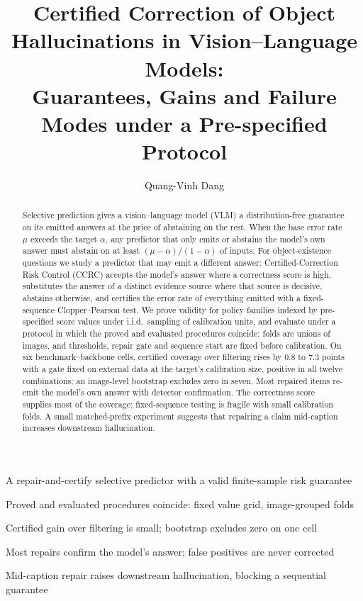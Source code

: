 \documentclass[review,number]{elsarticle}
\theoremstyle{plain}
\theoremstyle{definition}
\theoremstyle{remark}
\begin{document}
\begin{frontmatter}
\title{Certified Correction of Object Hallucinations in Vision--Language Models:\\
Guarantees, Gains and Failure Modes under a Pre-specified Protocol}

\author[bu]{Quang-Vinh Dang}
\address[bu]{British University Vietnam, Hung Yen, Vietnam}

\begin{abstract}
Selective prediction gives a vision--language model (VLM) a distribution-free guarantee on its emitted answers
at the price of abstaining on the rest. When the base error rate $\mu$ exceeds the target $\alpha$, any
predictor that only emits or abstains the model's own answer must abstain on at least $(\mu-\alpha)/(1-\alpha)$ of
inputs. For object-existence questions we study a predictor that may emit a different answer: Certified-Correction Risk Control (CCRC) accepts the
model's answer where a correctness score is high, substitutes the answer of a distinct evidence source where that source is decisive, abstains otherwise, and certifies the error rate of
everything emitted with a fixed-sequence Clopper--Pearson test. We prove validity for policy families indexed by
pre-specified score values under i.i.d.\ sampling of calibration units, and evaluate under a protocol in which the
proved and evaluated procedures coincide: folds are unions of images, and thresholds, repair gate and sequence start
are fixed before calibration. On six benchmark--backbone cells, certified coverage over filtering rises by $0.8$ to $7.3$
points with a gate fixed on external data at the target's calibration size, positive in all twelve combinations; an image-level bootstrap excludes zero in seven. Most repaired items re-emit the model's own answer with
detector confirmation. The correctness score supplies most of the coverage; fixed-sequence testing is fragile with small calibration folds. A small matched-prefix experiment suggests that repairing a claim mid-caption increases downstream
hallucination.
\end{abstract}

\begin{highlights}
\item A repair-and-certify selective predictor with a valid finite-sample risk guarantee
\item Proved and evaluated procedures coincide: fixed value grid, image-grouped folds
\item Certified gain over filtering is small; bootstrap excludes zero on one cell
\item Most repairs confirm the model's answer; false positives are never corrected
\item Mid-caption repair raises downstream hallucination, blocking a sequential guarantee
\end{highlights}


\end{frontmatter}
\end{document}
